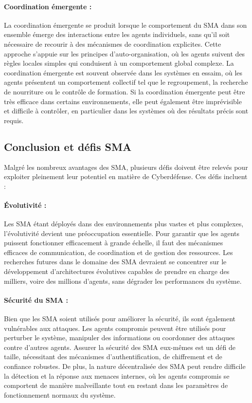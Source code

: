 \paragraph{Coordination émergente :}
La coordination émergente se produit lorsque le comportement du SMA dans son ensemble émerge des interactions entre les agents individuels, sans qu'il soit nécessaire de recourir à des mécanismes de coordination explicites. Cette approche s'appuie sur les principes d'auto-organisation, où les agents suivent des règles locales simples qui conduisent à un comportement global complexe. La coordination émergente est souvent observée dans les systèmes en essaim, où les agents présentent un comportement collectif tel que le regroupement, la recherche de nourriture ou le contrôle de formation. Si la coordination émergente peut être très efficace dans certains environnements, elle peut également être imprévisible et difficile à contrôler, en particulier dans les systèmes où des résultats précis sont requis.

\subsection{Conclusion et défis SMA}

Malgré les nombreux avantages des SMA, plusieurs défis doivent être relevés pour exploiter pleinement leur potentiel en matière de Cyberdéfense. Ces défis incluent :

\paragraph{Évolutivité :}
Les SMA étant déployés dans des environnements plus vastes et plus complexes, l'évolutivité devient une préoccupation essentielle. Pour garantir que les agents puissent fonctionner efficacement à grande échelle, il faut des mécanismes efficaces de communication, de coordination et de gestion des ressources. Les recherches futures dans le domaine des SMA devraient se concentrer sur le développement d'architectures évolutives capables de prendre en charge des milliers, voire des millions d'agents, sans dégrader les performances du système.

\paragraph{Sécurité du SMA :}
Bien que les SMA soient utilisés pour améliorer la sécurité, ils sont également vulnérables aux attaques. Les agents compromis peuvent être utilisés pour perturber le système, manipuler des informations ou coordonner des attaques contre d'autres agents. Assurer la sécurité des SMA eux-mêmes est un défi de taille, nécessitant des mécanismes d'authentification, de chiffrement et de confiance robustes. De plus, la nature décentralisée des SMA peut rendre difficile la détection et la réponse aux menaces internes, où les agents compromis se comportent de manière malveillante tout en restant dans les paramètres de fonctionnement normaux du système.

